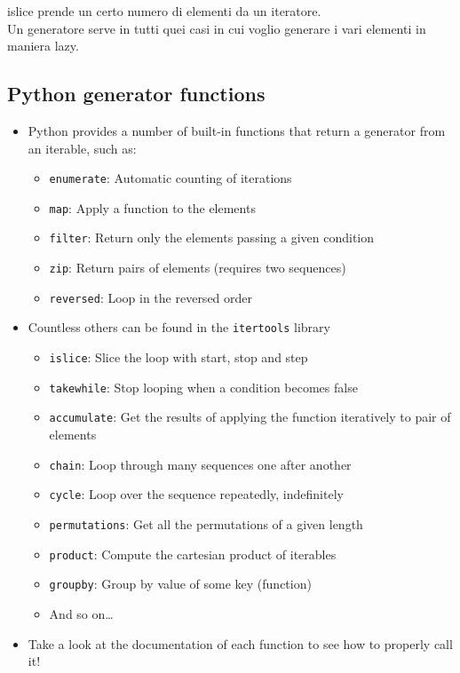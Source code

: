 islice prende un certo numero di elementi da un iteratore.\\

Un generatore serve in tutti quei casi in cui voglio generare i vari elementi in maniera lazy.\\

  \subsection{Python generator functions}
  
  \begin{itemize}
    \item Python provides a number of built-in functions that return a generator from an iterable, such as:
    \begin{itemize}
      \item \texttt{enumerate}: Automatic counting of iterations
      \item \texttt{map}: Apply a function to the elements
      \item \texttt{filter}: Return only the elements passing a given condition
      \item \texttt{zip}: Return pairs of elements (requires two sequences)
      \item \texttt{reversed}: Loop in the reversed order
    \end{itemize}

    \item Countless others can be found in the \alert{\texttt{itertools}} library
    \begin{itemize}
      \item \texttt{islice}: Slice the loop with start, stop and step
      \item \texttt{takewhile}: Stop looping when a condition becomes false
      \item \texttt{accumulate}: Get the results of applying the function iteratively to pair of elements
      \item \texttt{chain}: Loop through many sequences one after another
      \item \texttt{cycle}: Loop over the sequence repeatedly, indefinitely
      \item \texttt{permutations}: Get all the permutations of a given length
      \item \texttt{product}: Compute the cartesian product of iterables
      \item \texttt{groupby}: Group by value of some key (function)     
      \item And so on\dots
    \end{itemize}
    
    \medskip
    
    \item Take a look at the documentation of each function to see how to 
          properly call it!
  \end{itemize}  


